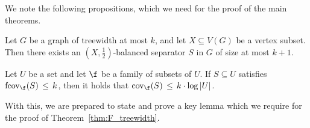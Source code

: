 We note the following propositions, which we need for the proof of the main theorems.


\begin{proposition}\label{prop:tw_and_balsep}
    Let $G$ be a graph of treewidth at most $k$, and let $X\subseteq V(G)$ be a vertex subset. Then there exists an $(X,\frac{1}{2})$-balanced separator $S$ in $G$ of size at most $k + 1$.
\end{proposition}


\begin{proposition}\label{prop:packing_covering_LP}
    Let $U$ be a set and let $\f$ be a family of subsets of $U$. If $S\subseteq U$ satisfies $\mathrm{fcov}_{\f}(S)\, \leq\, k$, then it holds that $\mathrm{cov}_{\f}(S)\, \leq\, k\cdot \log|U|$.
\end{proposition}


With this, we are prepared to state and prove a key lemma which we require for the proof of Theorem~\ref{thm:F_treewidth}.


